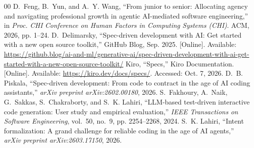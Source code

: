 \documentclass[conference]{IEEEtran}
\begin{document}
\begin{thebibliography}{00}
 D.~Feng, B.~Yun, and A.~Y. Wang, ``From junior to senior: Allocating agency and navigating professional growth in agentic AI-mediated software engineering,'' in \emph{Proc. CHI Conference on Human Factors in Computing Systems (CHI)}. ACM, 2026, pp. 1--24.
 D.~Delimarsky, ``Spec-driven development with AI: Get started with a new open source toolkit,'' GitHub Blog, Sep. 2025. [Online]. Available: \url{https://github.blog/ai-and-ml/generative-ai/spec-driven-development-with-ai-get-started-with-a-new-open-source-toolkit/}
 Kiro, ``Specs,'' Kiro Documentation. [Online]. Available: \url{https://kiro.dev/docs/specs/}. Accessed: Oct. 7, 2026.
 D.~B. Piskala, ``Spec-driven development: From code to contract in the age of AI coding assistants,'' \emph{arXiv preprint arXiv:2602.00180}, 2026.
 S.~Fakhoury, A.~Naik, G.~Sakkas, S.~Chakraborty, and S.~K. Lahiri, ``LLM-based test-driven interactive code generation: User study and empirical evaluation,'' \emph{IEEE Transactions on Software Engineering}, vol.~50, no.~9, pp. 2254--2268, 2024.
 S.~K. Lahiri, ``Intent formalization: A grand challenge for reliable coding in the age of AI agents,'' \emph{arXiv preprint arXiv:2603.17150}, 2026.
\end{thebibliography}
\end{document}
